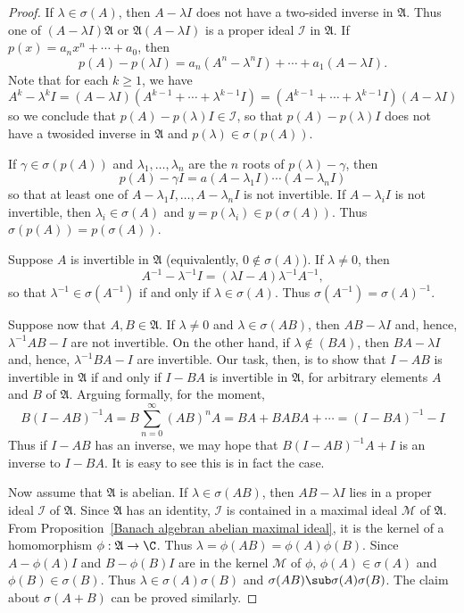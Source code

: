 \begin{proof}
If $\lambda\in\sigma(A)$, then $A-\lambda I$ does not have a two-sided inverse in $\mathfrak{A}$. Thus one of $(A-\lambda I)\mathfrak{A}$ or $\mathfrak{A}(A-\lambda I)$ is a proper ideal $\mathscr{I}$ in $\mathfrak{A}$. If $p(x)=a_nx^n+\cdots+a_0$, then
\[p(A)-p(\lambda I)=a_n(A^n-\lambda^nI)+\cdots+a_1(A-\lambda I).\]
Note that for each $k\geq 1$, we have
\[A^k-\lambda^kI=(A-\lambda I)(A^{k-1}+\cdots+\lambda^{k-1}I)=(A^{k-1}+\cdots+\lambda^{k-1}I)(A-\lambda I)\]
so we conclude that $p(A)-p(\lambda)I\in\mathscr{I}$, so that $p(A)-p(\lambda)I$ does not have a twosided inverse in $\mathfrak{A}$ and $p(\lambda)\in\sigma(p(A))$.\par
If $\gamma\in\sigma(p(A))$ and $\lambda_1,\dots,\lambda_n$ are the $n$ roots of $p(\lambda)-\gamma$, then
\[p(A)-\gamma I=a(A-\lambda_1 I)\cdots(A-\lambda_n I)\]
so that at least one of $A-\lambda_1 I,\dots,A-\lambda_nI$ is not invertible. If $A-\lambda_iI$ is not invertible, then $\lambda_i\in\sigma(A)$ and $y=p(\lambda_i)\in p(\sigma(A))$. Thus $\sigma(p(A))=p(\sigma(A))$.\par
Suppose $A$ is invertible in $\mathfrak{A}$ (equivalently, $0\notin\sigma(A)$). If $\lambda\neq 0$, then
\[A^{-1}-\lambda^{-1}I=(\lambda I-A)\lambda^{-1}A^{-1},\]
so that $\lambda^{-1}\in\sigma(A^{-1})$ if and only if $\lambda\in\sigma(A)$. Thus $\sigma(A^{-1})=\sigma(A)^{-1}$.\par
Suppose now that $A,B\in\mathfrak{A}$. If $\lambda\neq 0$ and $\lambda\in\sigma(AB)$, then $AB-\lambda I$ and, hence, $\lambda^{-1}AB-I$ are not invertible. On the other hand, if $\lambda\notin(BA)$, then $BA-\lambda I$ and, hence, $\lambda^{-1}BA-I$ are invertible. Our task, then, is to show that $I-AB$ is invertible in $\mathfrak{A}$ if and only if $I-BA$ is invertible in $\mathfrak{A}$, for arbitrary elements $A$ and $B$ of $\mathfrak{A}$. Arguing formally, for the moment,
\[B(I-AB)^{-1}A=B\sum_{n=0}^{\infty}(AB)^nA=BA+BABA+\cdots=(I-BA)^{-1}-I\]
Thus if $I-AB$ has an inverse, we may hope that $B(I-AB)^{-1}A+I$ is an inverse to $I-BA$. It is easy to see this is in fact the case.\par
Now assume that $\mathfrak{A}$ is abelian. If $\lambda\in\sigma(AB)$, then $AB-\lambda I$ lies in a proper ideal $\mathscr{I}$ of $\mathfrak{A}$. Since $\mathfrak{A}$ has an identity, $\mathscr{I}$ is contained in a maximal ideal $\mathscr{M}$ of $\mathfrak{A}$. From Proposition~\ref{Banach algebran abelian maximal ideal}, it is the kernel of a homomorphism $\phi:\mathfrak{A}\to\C$. Thus $\lambda=\phi(AB)=\phi(A)\phi(B)$. Since $A-\phi(A)I$ and $B-\phi(B)I$ are in the kernel $\mathscr{M}$ of $\phi$, $\phi(A)\in\sigma(A)$ and $\phi(B)\in\sigma(B)$. Thus $\lambda\in\sigma(A)\sigma(B)$ and $\sigma(AB)\sub\sigma(A)\sigma(B)$. The claim about $\sigma(A+B)$ can be proved similarly.
\end{proof}
